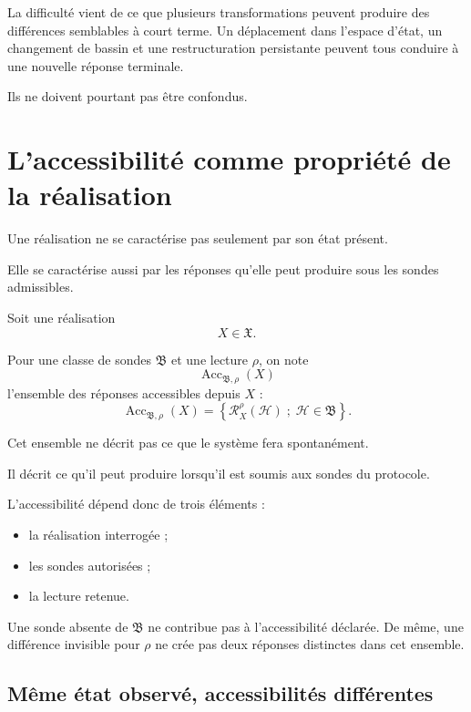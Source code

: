 La difficulté vient de ce que plusieurs transformations peuvent produire des différences semblables à court terme. Un déplacement dans l'espace d'état, un changement de bassin et une restructuration persistante peuvent tous conduire à une nouvelle réponse terminale.

Ils ne doivent pourtant pas être confondus.

\section{L'accessibilité comme propriété de la réalisation}
\label{t3-accessibilite-propriete-realisation}

Une réalisation ne se caractérise pas seulement par son état présent.

Elle se caractérise aussi par les réponses qu'elle peut produire sous les sondes admissibles.

Soit une réalisation
\[
X\in\mathfrak X.
\]

Pour une classe de sondes $\mathfrak B$ et une lecture $\rho$, on note
\[
\operatorname{Acc}_{\mathfrak B,\rho}(X)
\]
l'ensemble des réponses accessibles depuis $X$ :
\begin{equation}
\label{eq:t3-accessibilite}
\operatorname{Acc}_{\mathfrak B,\rho}(X)
=
\left\{
\mathcal R_X^\rho(\mathcal H)
\; ; \;
\mathcal H\in\mathfrak B
\right\}.
\end{equation}

Cet ensemble ne décrit pas ce que le système fera spontanément.

Il décrit ce qu'il peut produire lorsqu'il est soumis aux sondes du protocole.

L'accessibilité dépend donc de trois éléments :

\begin{itemize}
\tightlist
\item
  la réalisation interrogée ;
\item
  les sondes autorisées ;
\item
  la lecture retenue.
\end{itemize}

Une sonde absente de $\mathfrak B$ ne contribue pas à l'accessibilité déclarée. De même, une différence invisible pour $\rho$ ne crée pas deux réponses distinctes dans cet ensemble.

\subsection{Même état observé, accessibilités différentes}


